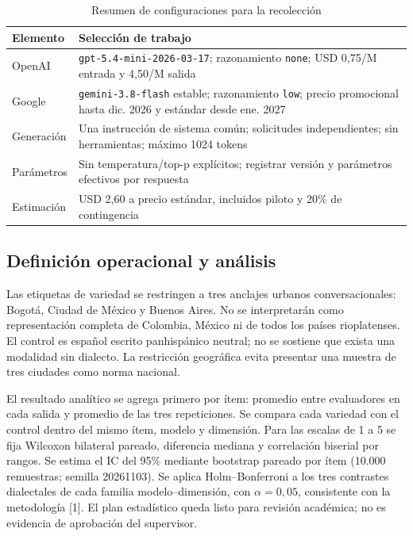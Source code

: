 \documentclass[conference]{IEEEtran}
\begin{document}
\begin{table}[!t]
\caption{Resumen de configuraciones para la recolección}
\centering
\scriptsize
\begin{tabularx}{\columnwidth}{p{}X}
\toprule
Elemento & Selección de trabajo \\
\midrule
OpenAI & \texttt{gpt-5.4-mini-2026-03-17}; razonamiento \texttt{none}; USD 0,75/M entrada y 4,50/M salida \\
Google & \texttt{gemini-3.8-flash} estable; razonamiento \texttt{low}; precio promocional hasta dic. 2026 y estándar desde ene. 2027 \\
Generación & Una instrucción de sistema común; solicitudes independientes; sin herramientas; máximo 1024 tokens \\
Parámetros & Sin temperatura/top-p explícitos; registrar versión y parámetros efectivos por respuesta \\
Estimación & USD 2,60 a precio estándar, incluidos piloto y 20\% de contingencia \\
\bottomrule
\end{tabularx}
\end{table}

\subsection{Definición operacional y análisis}
Las etiquetas de variedad se restringen a tres anclajes urbanos conversacionales: Bogotá, Ciudad de México y Buenos Aires. No se interpretarán como representación completa de Colombia, México ni de todos los países rioplatenses. El control es español escrito panhispánico neutral; no se sostiene que exista una modalidad sin dialecto. La restricción geográfica evita presentar una muestra de tres ciudades como norma nacional.

El resultado analítico se agrega primero por ítem: promedio entre evaluadores en cada salida y promedio de las tres repeticiones. Se compara cada variedad con el control dentro del mismo ítem, modelo y dimensión. Para las escalas de 1 a 5 se fija Wilcoxon bilateral pareado, diferencia mediana y correlación biserial por rangos. Se estima el IC del 95\% mediante bootstrap pareado por ítem (10.000 remuestras; semilla 20261103). Se aplica Holm--Bonferroni a los tres contrastes dialectales de cada familia modelo--dimensión, con $\alpha=0{,}05$, consistente con la metodología [1]. El plan estadístico queda listo para revisión académica; no es evidencia de aprobación del supervisor.
\end{document}
